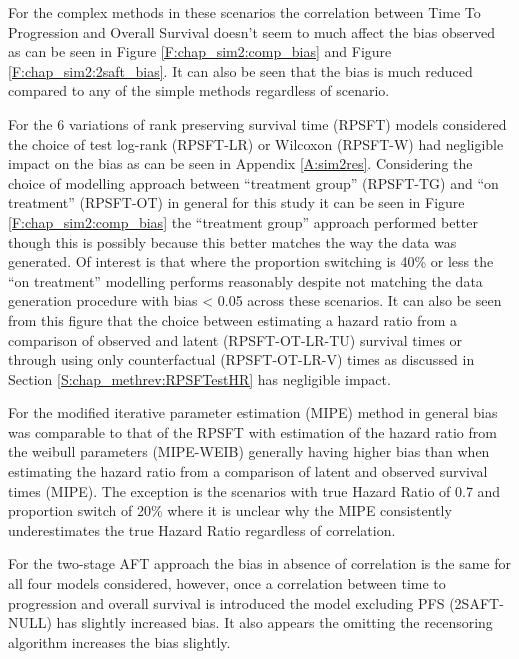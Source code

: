 For the complex methods in these scenarios the correlation between Time To Progression and Overall Survival doesn't seem to much affect the bias observed as can be seen in Figure \ref{F:chap_sim2:comp_bias} and Figure \ref{F:chap_sim2:2saft_bias}. It can also be seen that the bias is much reduced compared to any of the simple methods regardless of scenario.

For the 6 variations of rank preserving survival time (RPSFT) models considered the choice of test log-rank (RPSFT-LR) or Wilcoxon (RPSFT-W) had negligible impact on the bias as can be seen in Appendix \ref{A:sim2res}. Considering the choice of modelling approach between ``treatment group'' (RPSFT-TG) and ``on treatment'' (RPSFT-OT) in general for this study it can be seen in Figure \ref{F:chap_sim2:comp_bias} the ``treatment group'' approach performed better though this is possibly because this better matches the way the data was generated. Of interest is that where the proportion switching is 40\% or less the ``on treatment'' modelling performs reasonably despite not matching the data generation procedure with bias < 0.05 across these scenarios. It can also be seen from this figure that the choice between estimating a hazard ratio from a comparison of observed and latent (RPSFT-OT-LR-TU) survival times or through using only counterfactual (RPSFT-OT-LR-V) times as discussed in Section \ref{S:chap_methrev:RPSFTestHR} has negligible impact.

For the modified iterative parameter estimation (MIPE) method in general bias was comparable to that of the RPSFT with estimation of the hazard ratio from the weibull parameters (MIPE-WEIB) generally having higher bias than when estimating the hazard ratio from a comparison of latent and observed survival times (MIPE). The exception is the scenarios with true Hazard Ratio of 0.7 and proportion switch of 20\% where it is unclear why the MIPE consistently underestimates the true Hazard Ratio regardless of correlation.

For the two-stage AFT approach the bias in absence of correlation is the same for all four models considered, however, once a correlation between time to progression and overall survival is introduced the model excluding PFS (2SAFT-NULL) has slightly increased bias. It also appears the omitting the recensoring algorithm increases the bias slightly.


